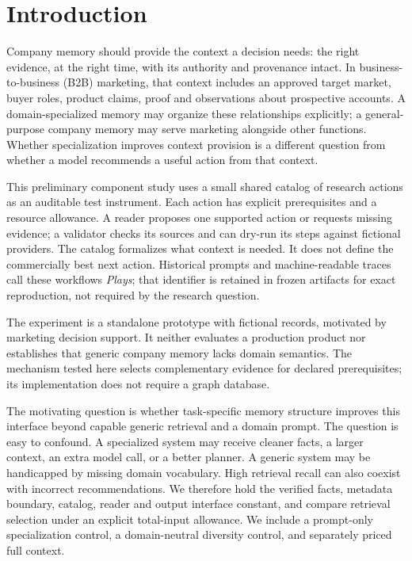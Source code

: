 \section{Introduction}
Company memory should provide the context a decision needs: the right evidence, at the right time, with its authority and provenance intact. In business-to-business (B2B) marketing, that context includes an approved target market, buyer roles, product claims, proof and observations about prospective accounts. A domain-specialized memory may organize these relationships explicitly; a general-purpose company memory may serve marketing alongside other functions. Whether specialization improves context provision is a different question from whether a model recommends a useful action from that context.

This preliminary component study uses a small shared catalog of research actions as an auditable test instrument. Each action has explicit prerequisites and a resource allowance. A reader proposes one supported action or requests missing evidence; a validator checks its sources and can dry-run its steps against fictional providers. The catalog formalizes what context is needed. It does not define the commercially best next action. Historical prompts and machine-readable traces call these workflows \emph{Plays}; that identifier is retained in frozen artifacts for exact reproduction, not required by the research question.

The experiment is a standalone prototype with fictional records, motivated by marketing decision support. It neither evaluates a production product nor establishes that generic company memory lacks domain semantics. The mechanism tested here selects complementary evidence for declared prerequisites; its implementation does not require a graph database.

The motivating question is whether task-specific memory structure improves this interface beyond capable generic retrieval and a domain prompt. The question is easy to confound. A specialized system may receive cleaner facts, a larger context, an extra model call, or a better planner. A generic system may be handicapped by missing domain vocabulary. High retrieval recall can also coexist with incorrect recommendations. We therefore hold the verified facts, metadata boundary, catalog, reader and output interface constant, and compare retrieval selection under an explicit total-input allowance. We include a prompt-only specialization control, a domain-neutral diversity control, and separately priced full context.

